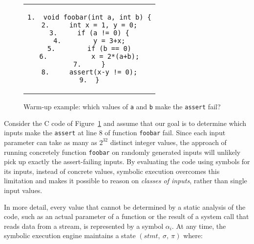 \begin{figure}[t]
\begin{center}
\begin{tabular}{c}
\begin{lstlisting}[basicstyle=\ttfamily\scriptsize]
1.  void foobar(int a, int b) {
2.     int x = 1, y = 0;
3.     if (a != 0) {
4.        y = 3+x;
5.        if (b == 0)
6.           x = 2*(a+b);
7.     }
8.     assert(x-y != 0);
9.  }
\end{lstlisting}
\end{tabular}
\end{center}
\vspace{-2mm}
\caption{Warm-up example: which values of \texttt{a} and \texttt{b} make the \texttt{assert} fail?}
\label{fig:example-1}
\vspace{-1.5mm}
\end{figure}

Consider the C code of Figure~\ref{fig:example-1} and assume that our goal is to determine which inputs make the {\tt assert} at line 8 of function \texttt{foobar} fail. Since each  input parameter can take as many as $2^{32}$ distinct integer values, the approach of running concretely function \texttt{foobar} on randomly generated inputs will unlikely pick up exactly the assert-failing inputs.
By evaluating the code using symbols for its inputs, instead of concrete values, symbolic execution overcomes this limitation and makes it possible to reason on {\em classes of inputs}, rather than single input values. 

In more detail, every value that cannot be determined by a static analysis of the code, such as an actual parameter of a function or the result of a system call that reads data from a stream, is represented by a symbol $\alpha_i$. At any time, the symbolic execution engine maintains a state $(stmt,~\sigma,~\pi)$ where:

